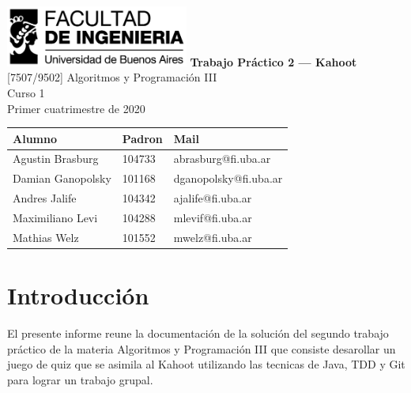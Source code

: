 \documentclass[titlepage,a4paper]{article}
\begin{document}
\begin{titlepage} %
	\hfill\includegraphics[width=6cm]{logofiuba.jpg}
    \centering
    \vfill
    \Huge \textbf{Trabajo Práctico 2 — Kahoot}
    \vskip2cm
    \Large [7507/9502] Algoritmos y Programación III\\
    Curso 1 \\ %
    Primer cuatrimestre de 2020
    \vfill
    \begin{tabular}{ | l | l | l |} %
      \hline
      Alumno & Padron & Mail \\ [0.5ex] 
      \hline\hline
     Agustin Brasburg & 104733 & abrasburg@fi.uba.ar\\ 
     \hline
     Damian Ganopolsky & 101168 & dganopolsky@fi.uba.ar\\
     \hline
     Andres Jalife & 104342 & ajalife@fi.uba.ar \\
     \hline
    Maximiliano Levi & 104288 & mlevif@fi.uba.ar \\
     \hline
     Mathias Welz & 101552 & mwelz@fi.uba.ar \\ [1ex] 
     \hline
  	\end{tabular}
    \vfill
    \vfill
\end{titlepage}

\tableofcontents %
\newpage

\section{Introducción}\label{sec:intro}
El presente informe reune la documentación de la solución del segundo trabajo práctico de la materia Algoritmos y Programación III que consiste desarollar un juego de quiz que se asimila al Kahoot utilizando las tecnicas de Java, TDD y Git para lograr un trabajo grupal.
\end{document}
